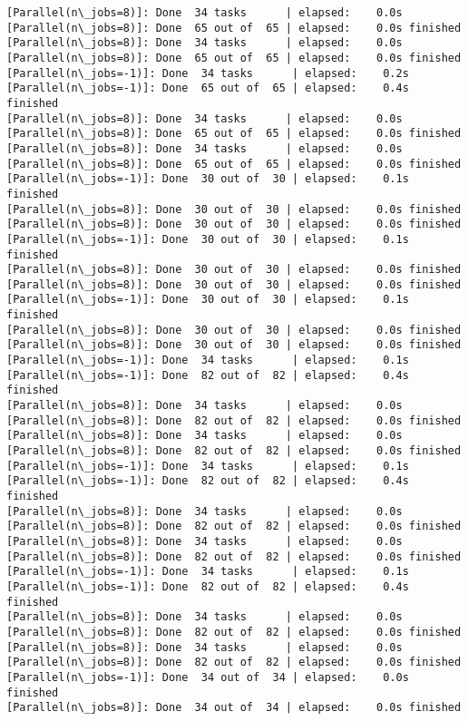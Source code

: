 \documentclass[11pt]{article}
\begin{document}
\begin{Verbatim}[commandchars=\\\{\}]
[Parallel(n\_jobs=8)]: Done  34 tasks      | elapsed:    0.0s
[Parallel(n\_jobs=8)]: Done  65 out of  65 | elapsed:    0.0s finished
[Parallel(n\_jobs=8)]: Done  34 tasks      | elapsed:    0.0s
[Parallel(n\_jobs=8)]: Done  65 out of  65 | elapsed:    0.0s finished
[Parallel(n\_jobs=-1)]: Done  34 tasks      | elapsed:    0.2s
[Parallel(n\_jobs=-1)]: Done  65 out of  65 | elapsed:    0.4s finished
[Parallel(n\_jobs=8)]: Done  34 tasks      | elapsed:    0.0s
[Parallel(n\_jobs=8)]: Done  65 out of  65 | elapsed:    0.0s finished
[Parallel(n\_jobs=8)]: Done  34 tasks      | elapsed:    0.0s
[Parallel(n\_jobs=8)]: Done  65 out of  65 | elapsed:    0.0s finished
[Parallel(n\_jobs=-1)]: Done  30 out of  30 | elapsed:    0.1s finished
[Parallel(n\_jobs=8)]: Done  30 out of  30 | elapsed:    0.0s finished
[Parallel(n\_jobs=8)]: Done  30 out of  30 | elapsed:    0.0s finished
[Parallel(n\_jobs=-1)]: Done  30 out of  30 | elapsed:    0.1s finished
[Parallel(n\_jobs=8)]: Done  30 out of  30 | elapsed:    0.0s finished
[Parallel(n\_jobs=8)]: Done  30 out of  30 | elapsed:    0.0s finished
[Parallel(n\_jobs=-1)]: Done  30 out of  30 | elapsed:    0.1s finished
[Parallel(n\_jobs=8)]: Done  30 out of  30 | elapsed:    0.0s finished
[Parallel(n\_jobs=8)]: Done  30 out of  30 | elapsed:    0.0s finished
[Parallel(n\_jobs=-1)]: Done  34 tasks      | elapsed:    0.1s
[Parallel(n\_jobs=-1)]: Done  82 out of  82 | elapsed:    0.4s finished
[Parallel(n\_jobs=8)]: Done  34 tasks      | elapsed:    0.0s
[Parallel(n\_jobs=8)]: Done  82 out of  82 | elapsed:    0.0s finished
[Parallel(n\_jobs=8)]: Done  34 tasks      | elapsed:    0.0s
[Parallel(n\_jobs=8)]: Done  82 out of  82 | elapsed:    0.0s finished
[Parallel(n\_jobs=-1)]: Done  34 tasks      | elapsed:    0.1s
[Parallel(n\_jobs=-1)]: Done  82 out of  82 | elapsed:    0.4s finished
[Parallel(n\_jobs=8)]: Done  34 tasks      | elapsed:    0.0s
[Parallel(n\_jobs=8)]: Done  82 out of  82 | elapsed:    0.0s finished
[Parallel(n\_jobs=8)]: Done  34 tasks      | elapsed:    0.0s
[Parallel(n\_jobs=8)]: Done  82 out of  82 | elapsed:    0.0s finished
[Parallel(n\_jobs=-1)]: Done  34 tasks      | elapsed:    0.1s
[Parallel(n\_jobs=-1)]: Done  82 out of  82 | elapsed:    0.4s finished
[Parallel(n\_jobs=8)]: Done  34 tasks      | elapsed:    0.0s
[Parallel(n\_jobs=8)]: Done  82 out of  82 | elapsed:    0.0s finished
[Parallel(n\_jobs=8)]: Done  34 tasks      | elapsed:    0.0s
[Parallel(n\_jobs=8)]: Done  82 out of  82 | elapsed:    0.0s finished
[Parallel(n\_jobs=-1)]: Done  34 out of  34 | elapsed:    0.0s finished
[Parallel(n\_jobs=8)]: Done  34 out of  34 | elapsed:    0.0s finished

\end{Verbatim}
\end{document}
